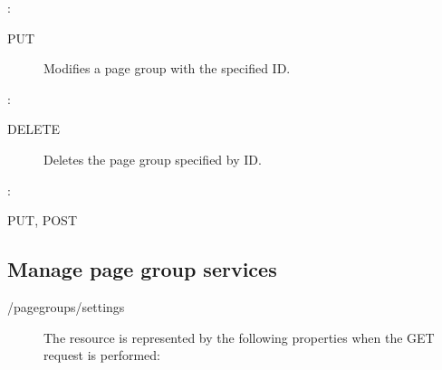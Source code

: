 \documentclass[letterpaper,10pt,english]{sphinxmanual}
\begin{document}
:

\begin{sphinxVerbatim}[commandchars=\\\{\}]
\end{sphinxVerbatim}
\begin{description}
\item[{ PUT}] \leavevmode
Modifies a page group with the specified ID.

\end{description}

:

\begin{sphinxVerbatim}[commandchars=\\\{\}]
\end{sphinxVerbatim}
\begin{description}
\item[{ DELETE}] \leavevmode
Deletes the page group specified by ID.

\end{description}

:

\begin{sphinxVerbatim}[commandchars=\\\{\}]
\end{sphinxVerbatim}

 PUT, POST


\subsection{Manage page group services}
\label{\detokenize{restapi:manage-page-group-services}}
 /pagegroups/settings
\begin{description}
\item[{}] \leavevmode
The resource is represented by the following properties when the GET request is performed:

\end{description}
\end{document}
